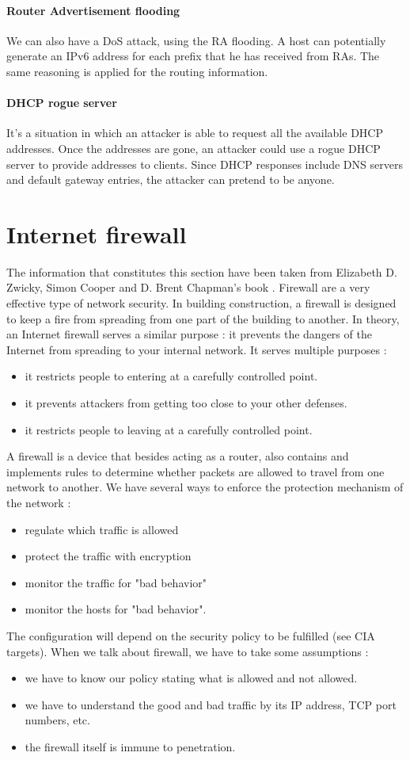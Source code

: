 \documentclass[11pt]{article}
\begin{document}
\paragraph{Router Advertisement flooding} We can also have a DoS attack, using the RA flooding. A host can potentially generate an IPv6 address for each prefix that he has received from RAs. The same reasoning is applied for the routing information.
\paragraph{DHCP rogue server} It's a situation in which an attacker is able to request all the available DHCP addresses. Once the addresses are gone, an attacker could use a rogue DHCP server to provide addresses to clients. Since DHCP responses include DNS servers and default gateway entries, the attacker can pretend to be anyone.
\section{Internet firewall}
The information that constitutes this section have been taken from Elizabeth D. Zwicky, Simon Cooper and D. Brent Chapman's book \cite{firewalls}. Firewall are a very effective type of network security. In building construction, a firewall is designed to keep a fire from spreading from one part of the building to another. In theory, an Internet firewall serves a similar purpose : it prevents the dangers of the Internet from spreading to your internal network. It serves multiple purposes : 
\begin{itemize}
\item it restricts people to entering at a carefully controlled point.
\item it prevents attackers from getting too close to your other defenses.
\item it restricts people to leaving at a carefully controlled point.
\end{itemize}
A firewall is a device that besides acting as a router, also contains and implements rules to determine whether packets are allowed to travel from one network to another. We have several ways to enforce the protection mechanism of the network :
\begin{itemize}
\item regulate which traffic is allowed
\item protect the traffic with encryption
\item monitor the traffic for "bad behavior"
\item monitor the hosts for "bad behavior".
\end{itemize}
The configuration will depend on the security policy to be fulfilled (see CIA targets). When we talk about firewall, we have to take some assumptions : 
\begin{itemize}
\item we have to know our policy stating what is allowed and not allowed.
\item we have to understand the good and bad traffic by its IP address, TCP port numbers, etc.
\item the firewall itself is immune to penetration.
\end{itemize}
\end{document}
